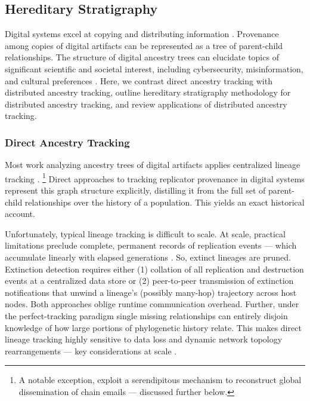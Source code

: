 \subsection{Hereditary Stratigraphy} \label{sec:hereditary-stratigraphy}

Digital systems excel at copying and distributing information \citep{miller2001taking}.
Provenance among copies of digital artifacts can be represented as a tree of parent-child relationships.
The structure of digital ancestry trees can elucidate topics of significant scientific and societal interest, including cybersecurity, misinformation, and cultural preferences \citep{aslan2020comprehensive,dupuis2019spread,ling2021dissecting}.
Here, we contrast direct ancestry tracking with distributed ancestry tracking, outline hereditary stratigraphy methodology for distributed ancestry tracking, and review applications of distributed ancestry tracking.

\subsubsection{Direct Ancestry Tracking}

Most work analyzing ancestry trees of digital artifacts applies centralized lineage tracking \citep{friggeri2014rumor,cohen1987computer,dolson2023phylotrackpy}.%
\footnote{A notable exception, \cite{libennowell2008tracing} exploit a serendipitous mechanism to reconstruct global dissemination of chain emails --- discussed further below.}
Direct approaches to tracking replicator provenance in digital systems represent this graph structure explicitly, distilling it from the full set of parent-child relationships over the history of a population.
This yields an exact historical account.

Unfortunately, typical lineage tracking is difficult to scale.
At scale, practical limitations preclude complete, permanent records of replication events --- which accumulate linearly with elapsed generations \citep{dolson2023algorithms}.
So, extinct lineages are pruned.
Extinction detection requires either (1) collation of all replication and destruction events at a centralized data store or (2) peer-to-peer transmission of extinction notifications that unwind a lineage's (possibly many-hop) trajectory across host nodes.
Both approaches oblige runtime communication overhead.
Further, under the perfect-tracking paradigm single missing relationships can entirely disjoin knowledge of how large portions of phylogenetic history relate.
This makes direct lineage tracking highly sensitive to data loss and dynamic network topology rearrangements --- key considerations at scale \citep{cappello2014toward,ackley2011pursue}.

